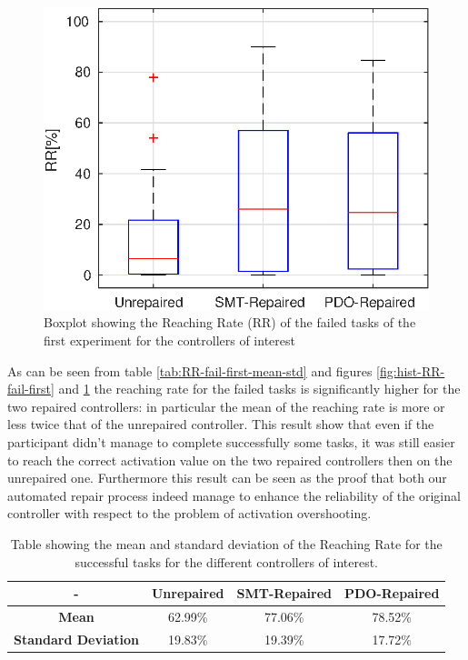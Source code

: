 \begin{figure}[H]
    \centering
    \includegraphics[width=\textwidth]{Images/first-experiment/exp0_RR_fail_box.eps}
    \caption{Boxplot showing the Reaching Rate (RR) of the failed tasks of the first experiment for the controllers of interest}
    \label{fig:box-RR-fail-first}
\end{figure}
As can be seen from table \ref{tab:RR-fail-first-mean-std} and figures \ref{fig:hist-RR-fail-first} and \ref{fig:box-RR-fail-first} the reaching rate for the failed tasks is significantly higher for the two repaired controllers: in particular the mean of the reaching rate is more or less twice that of the unrepaired controller. This result show that  even if the participant didn't manage to complete successfully some tasks, it was still easier to reach the correct activation value on the two repaired controllers then on the unrepaired one. Furthermore this result can be seen as the proof that both our automated repair process indeed manage to enhance the reliability of the original controller with respect to the problem of activation overshooting.\\
%
%
\begin{table}[H]
    \centering
    \begin{tabular}{|c|c|c|c|}
        \hline
        - & \textbf{Unrepaired} & \textbf{SMT-Repaired} & \textbf{PDO-Repaired} \\
        \hline
        \textbf{Mean} & 62.99\% & 77.06\% & 78.52\% \\
        \textbf{Standard Deviation} & 19.83\% & 19.39\% & 17.72\% \\
        \hline
    \end{tabular}
    \caption{Table showing the mean and standard deviation of the Reaching Rate for the successful tasks for the different controllers of interest.}
    \label{tab:RR-succ-first-mean-std}
\end{table}
